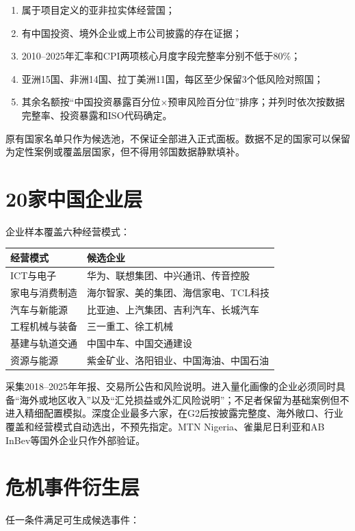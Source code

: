 \documentclass[UTF8,fontset=windows,12pt,openany]{ctexbook}
\begin{document}
\begin{enumerate}
  \item 属于项目定义的亚非拉实体经营国；
  \item 有中国投资、境外企业或上市公司披露的存在证据；
  \item 2010--2025年汇率和CPI两项核心月度字段完整率分别不低于80\%；
  \item 亚洲15国、非洲14国、拉丁美洲11国，每区至少保留3个低风险对照国；
  \item 其余名额按“中国投资暴露百分位\(\times\)预审风险百分位”排序；并列时依次按数据完整率、投资暴露和ISO代码确定。
\end{enumerate}

原有国家名单只作为候选池，不保证全部进入正式面板。数据不足的国家可以保留为定性案例或覆盖层国家，但不得用邻国数据静默填补。

\section{20家中国企业层}

企业样本覆盖六种经营模式：

\begin{longtable}{p{3.0cm}p{10.1cm}}
\toprule
\textbf{经营模式} & \textbf{候选企业}\\
\midrule
ICT与电子 & 华为、联想集团、中兴通讯、传音控股\\
家电与消费制造 & 海尔智家、美的集团、海信家电、TCL科技\\
汽车与新能源 & 比亚迪、上汽集团、吉利汽车、长城汽车\\
工程机械与装备 & 三一重工、徐工机械\\
基建与轨道交通 & 中国中车、中国交通建设\\
资源与能源 & 紫金矿业、洛阳钼业、中国海油、中国石油\\
\bottomrule
\end{longtable}

采集2018--2025年年报、交易所公告和风险说明。进入量化画像的企业必须同时具备“海外或地区收入”以及“汇兑损益或外汇风险说明”；不足者保留为基础案例但不进入精细配置模拟。深度企业最多六家，在G2后按披露完整度、海外敞口、行业覆盖和经营模式自动选出，不预先指定。MTN Nigeria、雀巢尼日利亚和AB InBev等国外企业只作外部验证。

\section{危机事件衍生层}

任一条件满足可生成候选事件：
\end{document}
